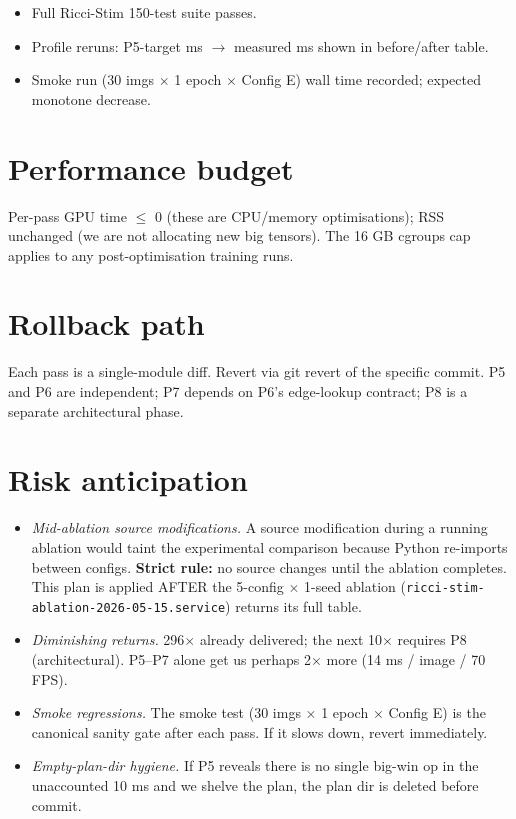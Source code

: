 \documentclass[11pt,a4paper]{article}
\begin{document}
\begin{itemize}
\item Full Ricci-Stim 150-test suite passes.
\item Profile reruns: P5-target ms $\to$ measured ms shown in
  before/after table.
\item Smoke run (30 imgs $\times$ 1 epoch $\times$ Config E) wall
  time recorded; expected monotone decrease.
\end{itemize}

\section{Performance budget}

Per-pass GPU time $\leq$ 0 (these are CPU/memory optimisations); RSS
unchanged (we are not allocating new big tensors). The 16 GB cgroups
cap applies to any post-optimisation training runs.

\section{Rollback path}

Each pass is a single-module diff. Revert via git revert of the
specific commit. P5 and P6 are independent; P7 depends on P6's
edge-lookup contract; P8 is a separate architectural phase.

\section{Risk anticipation}

\begin{itemize}
\item \emph{Mid-ablation source modifications.} A source modification
  during a running ablation would taint the experimental comparison
  because Python re-imports between configs. \textbf{Strict rule:}
  no source changes until the ablation completes. This plan is
  applied AFTER the 5-config $\times$ 1-seed ablation
  (\texttt{ricci-stim-ablation-2026-05-15.service}) returns its full table.

\item \emph{Diminishing returns.} 296$\times$ already delivered; the
  next 10$\times$ requires P8 (architectural). P5--P7 alone get us
  perhaps 2$\times$ more (14 ms / image / 70 FPS).

\item \emph{Smoke regressions.} The smoke test (30 imgs $\times$
  1 epoch $\times$ Config E) is the canonical sanity gate after
  each pass. If it slows down, revert immediately.

\item \emph{Empty-plan-dir hygiene.} If P5 reveals there is no
  single big-win op in the unaccounted 10 ms and we shelve the
  plan, the plan dir is deleted before commit.
\end{itemize}
\end{document}
